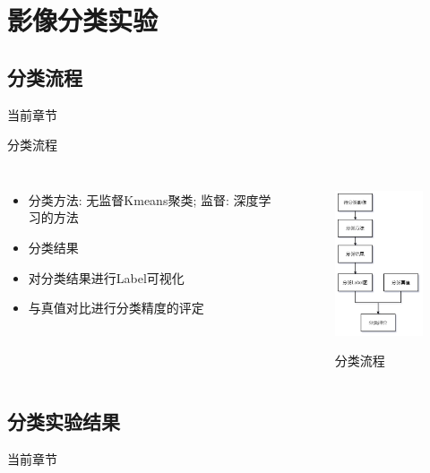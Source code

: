 \section{影像分类实验}




\subsection{分类流程}
\begin{frame}{当前章节}
\end{frame}

\begin{frame}{分类流程}
    \begin{columns}
        \begin{itemize}
            \item 分类方法: 无监督Kmeans聚类; 监督: 深度学习的方法
            \item 分类结果
            \item 对分类结果进行Label可视化
            \item 与真值对比进行分类精度的评定 
        \end{itemize}

        \begin{figure}
            \centering
            \includegraphics[height=5cm]{pic/pic0202.png}
            \caption{分类流程}
            \label{fig:0101}
        \end{figure}
    \end{columns}
\end{frame}

\subsection{分类实验结果}
\begin{frame}{当前章节}
\end{frame}


